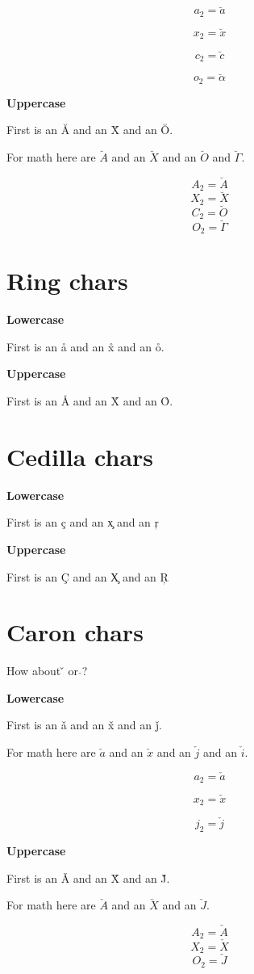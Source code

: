 ﻿\documentclass{article}
\begin{document}
$$a_2=\breve{a}$$

$$x_2=\breve{x}$$

$$c_2=\breve{c}$$

$$o_2=\breve{\alpha}$$

\textbf{Uppercase}

First is an \u{A} and an \u{X} and an \u{O}.

For math here are $\breve{A}$ and an $\breve{X}$ and an $\breve{O}$ and $\breve{\Gamma}$.

$$A_2=\breve{A}$$
$$X_2=\breve{X}$$
$$C_2=\breve{O}$$
$$O_2=\breve{\Gamma}$$

\section{Ring chars}
\textbf{Lowercase}

First is an \r{a} and an \r{x} and an \r{o}.

\textbf{Uppercase}

First is an \r{A} and an \r{X} and an \r{O}.




\section{Cedilla chars}
\textbf{Lowercase}

First is an \c{c} and an \c{x} and an \c{r}

\textbf{Uppercase}

First is an \c{C} and an \c{X} and an \c{R}




\section{Caron chars}

How about \v{} or $\check{}$? 

\textbf{Lowercase}

First is an \v{a} and an \v{x} and an \v{j}.

For math here are $\check{a}$ and an $\check{x}$ and an $\check{j}$  and an $\check{i}$.

$$a_2=\check{a}$$

$$x_2=\check{x}$$

$$j_2=\check{j}$$

\textbf{Uppercase}

First is an \v{A} and an \v{X} and an \v{J}.

For math here are $\check{A}$ and an $\check{X}$ and an $\check{J}$.

$$A_2=\check{A}$$
$$X_2=\check{X}$$
$$O_2=\check{J}$$
\end{document}
